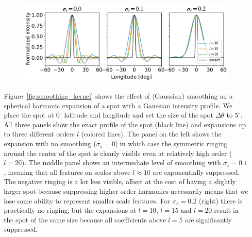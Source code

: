 \documentclass[linenumbers,modern]{aastex62}
\begin{document}
\begin{figure}[t!]
    \begin{centering}
    \includegraphics[width=1.\linewidth]{figures/smoothing_kernel.pdf}
    \end{centering}
\end{figure}


Figure~\ref{fig:smoothing_kernel} shows the effect of (Gaussian) smoothing on a spherical harmonic expansion of a spot with a Gaussian intensity profile.
We place the spot at $0^\circ$ latitude and longitude and set the size of the spot $\Delta\theta$ to $5^\circ$.
All three panels show the exact profile of the spot (black line) and expansions up to three different orders $l$ (colored lines).
The panel on the left shows the expansion with no smoothing ($\sigma_s=0$) in which case the symmetric ringing around the center of the spot is clearly visible even at relatively high order ($l=20$).
The middle panel shows an intermediate level of smoothing with $\sigma_s=0.1$, meaning that all features on scales above $l\approx 10$ are exponentially suppressed.
The negative ringing is a lot less visible, albeit at the cost of having a slightly larger spot because suppressing higher order harmonics necessarily means that we lose some ability to represent smaller scale features.
For $\sigma_s=0.2$ (right) there is practically no ringing, but the expansions at $l=10$, $l=15$ and $l=20$ result in the spot of the same size because all coefficients above $l=5$ are significantly suppressed.
\end{document}
